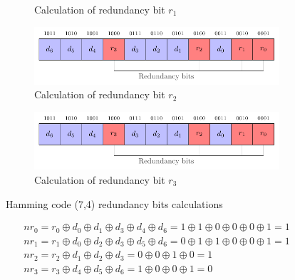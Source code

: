 \begin{figure}[ht]
\begin{subfigure}[b]{0.49\textwidth}
        \caption{Calculation of redundancy bit $r_1$}
        \label{fig:hamming_code_example_3}
    \end{subfigure}
    \hfill
    \begin{subfigure}[b]{0.49\textwidth}
        \includegraphics[width=\textwidth, page=8]{c5_countermeasures_dift/img/hamming_bit.pdf}
        \caption{Calculation of redundancy bit $r_2$}
        \label{fig:hamming_code_example_4}
    \end{subfigure}
    \hfill
    \begin{subfigure}[b]{0.49\textwidth}
        \includegraphics[width=\textwidth, page=10]{c5_countermeasures_dift/img/hamming_bit.pdf}
        \caption{Calculation of redundancy bit $r_3$}
        \label{fig:hamming_code_example_5}
    \end{subfigure}
    \caption{Hamming code (7,4) redundancy bits calculations}
    \label{fig:hamming_code_example}
\end{figure}

\begin{equation} \label{equat:hamming_decoder}
    \begin{split}
        nr_{0} = r_{0} \oplus d_{0} \oplus d_{1} \oplus d_{3} \oplus d_{4} \oplus d_{6} = 1 \oplus 1 \oplus 0 \oplus 0 \oplus 0 \oplus 1    = 1 \\
        nr_{1} = r_{1} \oplus d_{0} \oplus d_{2} \oplus d_{3} \oplus d_{5} \oplus d_{6} = 0 \oplus 1 \oplus 1 \oplus 0 \oplus 0 \oplus 1    = 1 \\
        nr_{2} = r_{2} \oplus d_{1} \oplus d_{2} \oplus d_{3}                           = 0 \oplus 0 \oplus 1 \oplus 0                      = 1 \\
        nr_{3} = r_{3} \oplus d_{4} \oplus d_{5} \oplus d_{6}                           = 1 \oplus 0 \oplus 0 \oplus 1                      = 0
    \end{split}
\end{equation}

